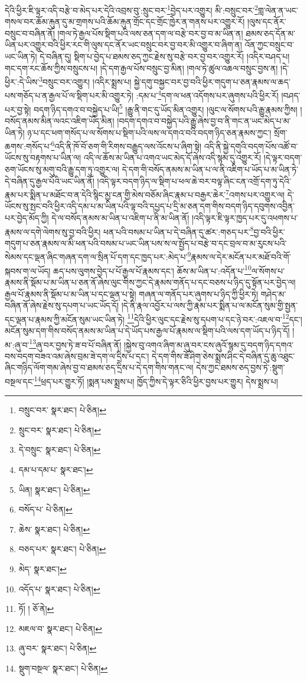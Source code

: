 དེའི་ཕྱིར་ཇི་ལྟར་འདི་བརྩེ་བ་མེད་པར་དེའི་འབྲས་བུ་:སྲུང་བར་\footnote{བསྲུང་བར་  སྣར་ཐང་།  པེ་ཅིན། }བྱེད་པར་འགྱུར། མི་:བསྲུང་བར་\footnote{སྲུང་བར་  སྣར་ཐང་།  པེ་ཅིན། }གླ་ལེན་ན་ཡང་གསལ་བར་ཆོམ་རྐུན་དུ་མ་གྲགས་པའི་ཆོམ་རྐུན་གྲོང་དང་གྲོང་ཁྱེར་ན་གནས་པར་འགྱུར་རོ། །ལུས་དང་ནོར་བསྲུང་བ་བཞིན་ནོ། །གལ་ཏེ་རྒྱལ་པོས་སྡིག་པའི་ལས་ཅན་དག་ལ་བརྩེ་བར་བྱ་བ་མ་ཡིན་ན། ཐམས་ཅད་དོན་མ་ཡིན་པར་འགྱུར་བའི་ཕྱིར་རང་གི་ལུས་དང་ནོར་ཡང་བསྲུང་བར་བྱ་བར་མི་འགྱུར་བ་ཞིག་ན། འོན་ཀྱང་བསྲུང་བ་ཡང་ཡིན་ཏེ། དེ་བཞིན་དུ། སྡིག་པ་བྱེད་པ་ཐམས་ཅད་ཀྱང་རྗེས་སུ་བརྩེ་བར་བྱ་བར་འགྱུར་རོ། །འདིར་བཤད་པ། གང་དག་རང་ཆོས་ཀྱིས་བསྲུངས་པ། །དེ་དག་རྒྱལ་པོས་བསྲུང་བྱ་མིན། །གལ་ཏེ་ཚུལ་འཆལ་བསྲུང་བྱས་ན། །དེ་ཕྱིར་:དེ་ཡིས་\footnote{དེ་བསྲུང་  སྣར་ཐང་།  པེ་ཅིན། }བསྲུང་བར་འགྱུར། །འདིར་སྨྲས་པ། སྐྱེ་དགུ་བསྐྱང་བར་བྱ་བའི་ཕྱིར་གདུག་པ་ཅན་རྣམས་ལ་ཆད་པས་གཅོད་པ་ན་རྒྱལ་པོ་ལ་སྡིག་པར་མི་འགྱུར་ཏེ། :དམ་པ་\footnote{དམ་པ་དམ་པ་  སྣར་ཐང་། }དག་ལ་ཕན་འདོགས་པར་ཞུགས་པའི་ཕྱིར་རོ། །བཤད་པར་བྱ་སྟེ། བདག་ཉིད་དགའ་བ་བསྐྱེད་པ་ཡི།\footnote{ཡིན།  སྣར་ཐང་།  པེ་ཅིན། } །རྒྱུ་ནི་གང་དུ་ཡོད་མིན་འགྱུར། །ལུང་ལ་སོགས་པའི་རྒྱུ་རྣམས་ཀྱིས། །བསོད་ནམས་མིན་ལའང་འཇིག་ཡོད་མིན། །བདག་དགའ་བ་བསྐྱེད་པའི་རྒྱུ་ཞེས་བྱ་བ་ནི་གང་ན་ཡང་མེད་པ་མ་ཡིན་ཏེ། ཉ་པ་དང་ཕག་གསོད་པ་ལ་སོགས་པ་སྡིག་པའི་ལས་ལ་དགའ་བའི་བདག་ཉིད་ཅན་རྣམས་ཀྱང་། སྲོག་ཆགས་:གསོད་པ་\footnote{བསོད་པ་  པེ་ཅིན། }འདི་ནི་ཁོ་བོ་ཅག་གི་རིགས་བརྒྱུད་ལས་འོངས་པ་ཞིག་སྟེ། འདི་ནི་སྐྱེ་དགུའི་བདག་པོས་འཚོ་བ་ཡོངས་སུ་བརྟགས་པ་ཡིན་ལ། འདི་ལ་ཆོས་མ་ཡིན་པ་འགའ་ཡང་མེད་དོ་ཞེས་འདི་སྙམ་དུ་འགྱུར་རོ། །དེ་ལྟར་བདག་ཅག་ཡོངས་སུ་མགུ་བའི་རྒྱུ་དག་ཏུ་འགྱུར་ལ། དེ་དག་གི་བསོད་ནམས་མ་ཡིན་པ་ལ་ནི་འཇིག་པ་ཡོད་པ་མ་ཡིན་ཏེ་དེ་བཞིན་དུ་རྒྱལ་པོའི་ཡང་ཡིན་ནོ། །འདི་ལྟར་བདག་ཉིད་ལ་སྡིག་པ་ཕལ་ཆེ་བར་བལྟ་ཞིང་ངན་འགྲོ་དག་ཏུ་དེའི་རྣམ་པར་སྨིན་པ་མཐོང་བ་ན་དེའི་སྙིང་མྱ་ངན་གྱི་མེས་བཅོམ་ཞིང་རྣམ་པ་བརྒྱར་ཆེར་\footnote{ཆེས་  སྣར་ཐང་།  པེ་ཅིན། }འགས་པར་འགྱུར་ལ། དེ་ཡོངས་སུ་སྤང་བའི་ཕྱིར་འདི་དམ་པ་མ་ཡིན་པའི་ལྟ་བའི་དཔྱད་པ་དྲི་མ་ཅན་དག་གིས་བདག་ཉིད་དབུགས་འབྱིན་པར་བྱེད་མོད་ཀྱི། དེ་ལ་བསོད་ནམས་མ་ཡིན་པ་འཇིག་པ་ནི་མ་ཡིན་ནོ། །འདི་ལྟར་ཇི་ལྟར་ཁྱད་པར་དུ་འཕགས་པ་རྣམས་ལ་དགེ་ལེགས་སུ་བྱ་བའི་ཕྱིར། ཕན་པའི་བསམ་པ་ཡིན་པ་དེ་བཞིན་དུ་ཚར་:གཅད་པར་\footnote{བཅད་པར་  སྣར་ཐང་།  པེ་ཅིན། }བྱ་བའི་ཕྱིར་གདུག་པ་ཅན་རྣམས་ལ་མི་ཕན་པའི་བསམ་པ་ཡང་ཡིན་པས་ས་ལ་སྤྱོད་པ་བརྩེ་བ་དང་བྲལ་བ་མ་རུངས་པའི་སེམས་དང་ལྡན་ཞིང་གཞན་དག་ལ་སྲིན་པོ་དག་དང་ཁྱད་པར་:མེད་པ་\footnote{མེད་  སྣར་ཐང་། }རྣམས་ལ་དེར་མངོན་པར་མཐོ་བའི་གོ་སྐབས་ག་ལ་ཡོད། ཆད་པས་ལུགས་བྱེད་པ་པོ་རྒྱལ་པོ་རྣམས་དང་། ཆོས་མ་ཡིན་པ་:འདོན་པ་\footnote{འདོད་པ་  སྣར་ཐང་།  པེ་ཅིན། }ལ་སོགས་པ་རྣམས་ནི་སྡོམ་པ་མ་ཡིན་པ་ཅན་ནོ་ཞེས་ལུང་གིས་ཀྱང་དེ་རྣམས་གནོད་པ་དང་བཅས་པ་ཉིད་དུ་སྟོན་པར་བྱེད་ལ། རྒྱལ་པོ་རྣམས་ནི་སྡོམ་པ་མ་ཡིན་པ་དང་ལྡན་པ་སྟེ། གཞན་ལ་གནོད་པར་ཞུགས་པ་ཉིད་ཀྱི་ཕྱིར་ཏེ། གཤེད་མ་བཞིན་ནོ་ཞེས་རྗེས་སུ་དཔག་པ་ཡང་ཡོད་དོ། །དེ་ནི་རྣལ་འབྱོར་པ་ལས་ཀྱི་རྣམ་པར་སྨིན་པ་ལ་མངོན་སུམ་གྱི་སྤྱན་དང་ལྡན་པ་རྣམས་ཀྱི་མངོན་སུམ་ཡང་ཡིན་ཏེ། \footnote{ཏོ། །   ཅོ་ནེ། }དེའི་ཕྱིར་ལུང་དང་རྗེས་སུ་དཔག་པ་དང་ཉེ་བར་:འཇལ་བ་\footnote{མཇལ་བ་  སྣར་ཐང་།  པེ་ཅིན། }དང་། མངོན་སུམ་དག་གིས་བསོད་ནམས་མ་ཡིན་པ་དེ་ཡོད་པས་རྒྱལ་པོ་རྣམས་ལ་སྡིག་པའི་ལས་དག་ཡོད་པ་ཉིད་དོ། །མ་:ཞུ་བ་\footnote{ཞུ་བར་  སྣར་ཐང་།  པེ་ཅིན། }ཞུ་བར་བྱས་ཏེ་ཟ་བ་པོ་བཞིན་ནོ། །སྐྱེས་བུ་འགའ་ཞིག་མ་ཞུ་བར་ངས་ཞུའོ་སྙམ་དུ་བདག་ཉིད་དགའ་བས་བདག་བཟའ་འམ་ཞེས་བྲམ་ཟེ་དག་ལ་དྲིས་པ་དང་། དེ་དག་གིས་ཟོ་ཤིག་ཅེས་སྨྲས་ཤིང་དེ་བཞིན་དུ་ཆུ་འཐུང་ཞིང་གཉིད་ལོག་གམ་ཞེས་བྱ་བ་ཐམས་ཅད་དྲིས་པ་དེ་དག་གིས་གནང་ལ། དེས་ཀྱང་ཐམས་ཅད་བྱས་ཏེ་:སྡུག་བསྔལ་དང་\footnote{སྡུག་བསྔལ་  སྣར་ཐང་།  པེ་ཅིན། }ཕྲད་པར་གྱུར་ཏོ། །སྨན་པས་སྨྲས་པ། ཁྱོད་ཀྱིས་དེ་ལྟར་ཅིའི་ཕྱིར་བྱས་པར་གྱུར། དེས་སྨྲས་པ། 